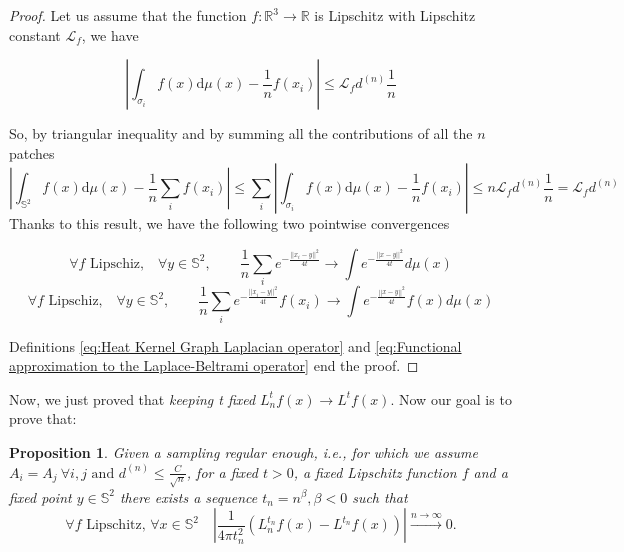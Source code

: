 \documentclass{article} %
\newtheorem{prop}{Proposition}
\begin{document}
\begin{proof}

	Let us assume that the function $f:\mathbb R^3\rightarrow \mathbb R$ is Lipschitz with Lipschitz constant $\mathcal L_f$, we have

	$$\left| \int_{\sigma_{i}}f({ x})\text{d}{\mu(x)} - \frac{1}{n}f( x_i)\right| \leq \mathcal L_fd^{(n)}\frac{1}{n} $$

	So, by triangular inequality and by summing all the contributions of all the $n$ patches
	$$\left| \int_{\mathbb S^2}f({ x})\text{d}{\mu(x)} - \frac{1}{n}\sum_i f( x_i)\right| \leq \sum_i \left| \int_{\sigma_{i}}f({ x})\text{d}{\mu(x)} - \frac{1}{n}f( x_i)\right|\leq n  \mathcal L_fd^{(n)}\frac{1}{n} = \mathcal L_fd^{(n)}$$
	Thanks to this result, we have the following two pointwise convergences

	$$\forall f \text{ Lipschiz,}\quad \forall y\in\mathbb S^2,  \quad\quad \frac{1}{n}\sum_i e^{-\frac{||x_i-y||^2}{4t}}\rightarrow \int e^{-\frac{||x-y||^2}{4t}}d\mu(x)$$
	$$\forall f \text{ Lipschiz,}\quad \forall y\in\mathbb S^2,  \quad\quad \frac{1}{n}\sum_i e^{-\frac{||x_i-y||^2}{4t}}f(x_i)\rightarrow \int e^{-\frac{||x-y||^2}{4t}}f(x)d\mu(x)$$

	Definitions \ref{eq:Heat Kernel Graph Laplacian operator} and \ref{eq:Functional approximation to the Laplace-Beltrami operator} end the proof.
\end{proof}
\vspace{0.5cm}

Now, we just proved that \textit{keeping t fixed} $L_n^tf(x)\rightarrow L^tf(x)$. Now our goal is to prove that:

\vspace{0.5cm}
\begin{prop}\label{prop:2}
	Given a sampling regular enough, i.e., for which we assume $A_i=A_j \ \forall i,j\text{ and }d^{(n)}\leq \frac{C}{\sqrt{n}}$, for a fixed $t>0$, a fixed Lipschitz function $f$ and a fixed point $y\in\mathbb S^2$ there exists a sequence $t_n = n^\beta, \beta<0$ such that
$$
\forall f \text{ Lipschitz, } \forall x\in\mathbb S^2 \quad \left|\frac{1}{4\pi t_n^2}\left(L_n^{t_n}f(x) - L^{t_n}f(x)\right)\right|\xrightarrow{n\to \infty}0.
$$
\end{prop}
\vspace{0.5cm}
\end{document}
